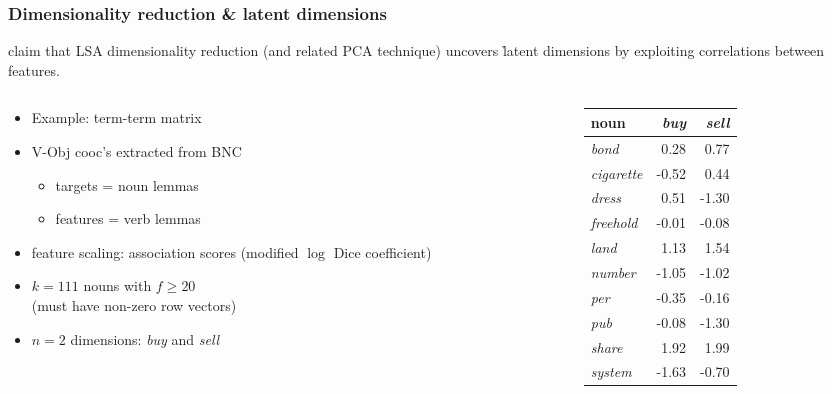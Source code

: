 \documentclass[t]{beamer} %
\begin{document}
\begin{frame}
  \frametitle{Dimensionality reduction \& latent dimensions}

  \citet{Landauer:Dumais:97} claim that LSA dimensionality reduction (and related PCA technique) uncovers \h{latent dimensions} by exploiting correlations between features.

  \begin{columns}
    \begin{column}{6.5cm}
      \begin{itemize}
      \item Example: term-term matrix
      \item V-Obj cooc's extracted from BNC
        \begin{itemize}
        \item targets = noun lemmas\\
        \item features = verb lemmas
        \end{itemize}
      \item feature scaling: association scores (modified $\log$ Dice
        coefficient)
      \item $k=111$ nouns with $f \geq 20$\\
        (must have non-zero row vectors)
      \item $n=2$ dimensions: \emph{buy} and \emph{sell}
      \end{itemize}
    \end{column}
    \begin{column}{4cm}
      \begin{center}\footnotesize
        \begin{tabular}{l|rr}
          noun & \emph{buy} & \emph{sell} \\
          \hline
          \emph{bond}      &  0.28 &  0.77\\
          \emph{cigarette} & -0.52 &  0.44\\
          \emph{dress}     &  0.51 & -1.30\\
          \emph{freehold}  & -0.01 & -0.08\\
          \emph{land}      &  1.13 &  1.54\\
          \emph{number}    & -1.05 & -1.02\\
          \emph{per}       & -0.35 & -0.16\\
          \emph{pub}       & -0.08 & -1.30\\
          \emph{share}     &  1.92 &  1.99\\
          \emph{system}    & -1.63 & -0.70
        \end{tabular}
      \end{center}
    \end{column}
  \end{columns}
\end{frame}
\end{document}
